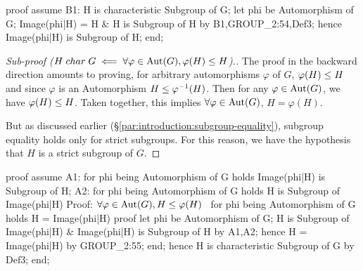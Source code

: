 \nwenddocs{}\endmoddef\nwstartdeflinemarkup{}\nwenddeflinemarkup
proof
  assume B1: H is characteristic Subgroup of G;
  let phi be Automorphism of G;
  Image(phi|H) = H & H is Subgroup of H by B1,GROUP_2:54,Def3;
  hence Image(phi|H) is Subgroup of H;
end;
\nwendcode{}\nwdocspar

\begin{proof}[Sub-proof ($H\mathrel{char} G\impliedby\forall\varphi\in\operatorname{Aut}(G),\varphi(H)\leq H$).]
The proof in the backward direction amounts to proving, for arbitrary
automorphisms $\varphi$ of $G$, $\varphi(H)\leq H$ and since
$\varphi$ is an Automorphism $H\leq \varphi^{-1}(H)$. Then for any
$\varphi\in\operatorname{Aut}(G)$, we have $\varphi(H)\leq H$. Taken together,
this implies $\forall\varphi\in\operatorname{Aut}(G)$, $H = \varphi(H)$.

But as discussed earlier (\S\ref{par:introduction:subgroup-equality}),
subgroup equality holds only for strict subgroups. For this reason, we
have the hypothesis that $H$ is a strict subgroup of $G$.
\end{proof}

\nwenddocs{}\endmoddef\nwstartdeflinemarkup{}\nwenddeflinemarkup
proof
  assume A1: for phi being Automorphism of G
  holds Image(phi|H) is Subgroup of H;
  A2: for phi being Automorphism of G holds H is Subgroup of Image(phi|H)
  \LA{}Proof: $\forall\varphi\in\operatorname{Aut}(G),H\leq\varphi(H)$~{\nwtagstyle{}}\RA{}
  for phi being Automorphism of G holds H = Image(phi|H)
  proof
    let phi be Automorphism of G;
    H is Subgroup of Image(phi|H) & Image(phi|H) is Subgroup of H
    by A1,A2;
    hence H = Image(phi|H) by GROUP_2:55;
  end;
  hence H is characteristic Subgroup of G by Def3;
end;
\nwendcode{}\nwdocspar

